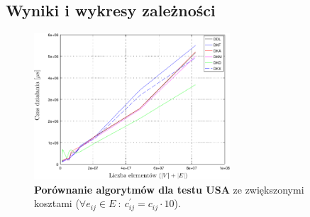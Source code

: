 \subsection{Wyniki i wykresy zależności}

\begin{figure}[!htbp]
	\centering
	\includegraphics[width=0.65\textwidth]{Chapter_IV/graphx1Cost_psfrag.pdf}
	\caption{ \textbf{Porównanie algorytmów dla testu \textsc{USA}} ze zwiększonymi kosztami ($\forall e_{ij} \in E \: : \: c^{'}_{ij} = c_{ij} \cdot 10$).}\label{fig:plotgraphx10Cost}
\end{figure}

